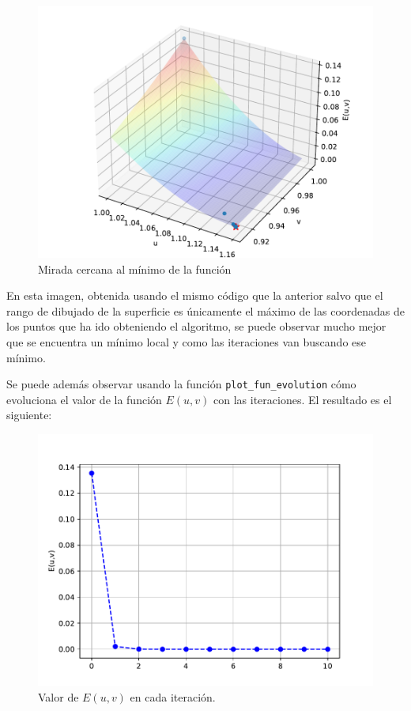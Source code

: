 \documentclass[12pt]{scrartcl}
\begin{document}
{\begin{figure}[H]
  \centering
  \includegraphics[scale=0.6]{media/E1-1-all.pdf}
  \caption{Mirada cercana al mínimo de la función}
\end{figure}

En esta imagen, obtenida usando el mismo código que la anterior salvo que el rango de dibujado de la superficie es únicamente el máximo de las coordenadas de los puntos que ha ido
obteniendo el algoritmo, se puede observar mucho mejor que se encuentra un mínimo local y como las iteraciones van buscando ese mínimo.

Se puede además observar usando la función \lstinline{plot_fun_evolution} cómo evoluciona el valor 
de la función $E(u,v)$ con las iteraciones. El resultado es el siguiente:

\begin{figure}[H]
  \centering
  \includegraphics[scale=0.6]{media/f_evolution_e1-1.pdf}
  \caption{Valor de $E(u,v)$ en cada iteración.}
\end{figure}

}
\end{document}
